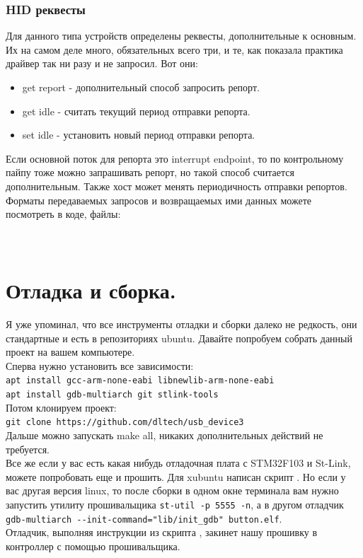 \documentclass[12pt,a4paper]{article}
\begin{document}
\subsubsection{HID реквесты}\label{2}
    Для данного типа устройств определены реквесты, дополнительные к основным.
    Их на самом деле много, обязательных всего три, и те, как показала практика
    драйвер так ни разу и не запросил. Вот они:
\begin{itemize}
    \item get report - дополнительный способ запросить репорт.
    \item get idle - считать текущий период отправки репорта.
    \item set idle - установить новый период отправки репорта.
\end{itemize}
    Если основной поток для репорта это interrupt endpoint, то по контрольному
    пайпу тоже можно запрашивать репорт, но такой способ считается
    дополнительным. Также хост может менять периодичность отправки репортов.
    Форматы передаваемых запросов и возвращаемых ими данных можете посмотреть
     в коде, файлы:\\
    \\
    \\

\newpage
\section{Отладка и сборка.}
    Я уже упоминал, что все инструменты отладки и сборки далеко не редкость,
    они стандартные и есть в репозиториях ubuntu. Давайте попробуем собрать
    данный проект на вашем компьютере.\\
    Сперва нужно установить все зависимости:\\
    \lstset{language=bash}
    \lstinline{apt install gcc-arm-none-eabi libnewlib-arm-none-eabi}\\
    \lstinline{apt install gdb-multiarch git stlink-tools}\\
    Потом клонируем проект:\\
    \lstinline{git clone https://github.com/dltech/usb_device3}\\
    Дальше можно запускать make all, никаких дополнительных действий не
    требуется.\\
    Все же если у вас есть какая нибудь отладочная плата с STM32F103 и St-Link,
    можете попробовать еще и прошить. Для xubuntu написан скрипт .
    Но если у вас другая версия linux, то после сборки в одном окне терминала
    вам нужно запустить утилиту прошивальщика \lstinline{st-util -p 5555 -n},
    а в другом отладчик\\
    \lstinline{gdb-multiarch --init-command="lib/init_gdb" button.elf}.\\
    Отладчик, выполняя инструкции из скрипта , закинет
    нашу прошивку в контроллер с помощью прошивальщика.
\end{document}
